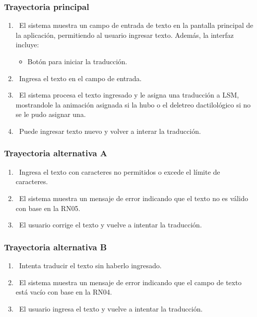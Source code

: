    

\subsubsection{Trayectoria principal}
\begin{enumerate}[label=\textbf{\arabic*}, leftmargin=1.5cm]
    \item \UCsystem \ El sistema muestra un campo de entrada de texto en la pantalla principal de la aplicación, permitiendo al usuario ingresar texto.  
    Además, la interfaz incluye:  
    \begin{itemize}
        \item Botón para iniciar la traducción.
    \end{itemize}

    \item \UCactor \ Ingresa el texto en el campo de entrada.  
   
    \item \UCsystem \ El sistema procesa el texto ingresado y le asigna una traducción a LSM, mostrandole la animación asignada si la hubo o el deletreo dactilológico si no se le pudo asignar una.

    \item \UCactor \ Puede ingresar texto nuevo y volver a interar la traducción.

\end{enumerate}

\subsubsection{Trayectoria alternativa A}
\begin{enumerate}[label=\textbf{\arabic*}, leftmargin=1.5cm]
    \item \UCactor \ Ingresa el texto con caracteres no permitidos o excede el límite de caracteres.
	\item \UCsystem \ El sistema muestra un mensaje de error indicando que el texto no es válido con base en la RN05.  
	\item \UCactor \ El usuario corrige el texto y vuelve a intentar la traducción.
\end{enumerate}

\subsubsection{Trayectoria alternativa B}
\begin{enumerate}[label=\textbf{\arabic*}, leftmargin=1.5cm]
    \item \UCactor \ Intenta traducir el texto sin haberlo ingresado.
	\item \UCsystem \ El sistema muestra un mensaje de error indicando que el campo de texto está vacío con base en la RN04.
	\item \UCactor \ El usuario ingresa el texto y vuelve a intentar la traducción.
\end{enumerate}

